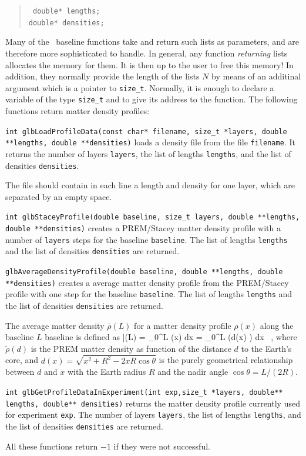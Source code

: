 \begin{quote}
{\tt  
  double* lengths; \\
  double* densities;
}
\end{quote}
Many of the \GLOBES\ baseline functions take and return
such lists as parameters, and are therefore more sophisticated
to handle. In general, any function
{\em returning} lists allocates the memory for them.
It is then up to the user to free this memory!
In addition, they normally provide the length of the lists $N$
by means of an additinal argument which is a pointer to {\tt size\_t}. 
Normally, it is enough to declare
a variable of the type {\tt size\_t} and to give its address to the function.
The following functions return matter density profiles:
\begin{function}
{\tt int glbLoadProfileData(const char* filename, size\_t *layers, double **lengths, double **densities)} loads a density file from the file
{\tt filename}. It returns the number of layers {\tt layers}, the
list of lengths {\tt lengths}, and the list of densities {\tt densities}.
\end{function}
The file should contain in each line a length and density for one layer,
which are separated by an empty space.
\begin{function}
{\tt int glbStaceyProfile(double baseline, size\_t layers, double **lengths, double **densities)} creates a PREM/Stacey matter density profile with a
number of {\tt layers} steps for the baseline {\tt baseline}. The list of lengths {\tt lengths} and the list of densities {\tt densities} are returned.
\end{function}
\begin{function}
{\tt glbAverageDensityProfile(double baseline, double **lengths, 
double **densities)} creates a average matter density profile from the PREM/Stacey profile with one step for the baseline {\tt baseline}. The list of lengths {\tt lengths} and the list of densities {\tt densities} are returned.
\end{function}
The average matter density $\bar{\rho}(L)$ for a matter density profile $\rho(x)$ along the baseline $L$ baseline is defined as
\be
\bar{\rho}(L) =  \int\limits_{0}^L \rho(x) dx = 
 \int\limits_{0}^L \tilde{\rho}\left(d(x) \right) dx \, , 
\ee
where $\tilde{\rho}(d)$ is the PREM matter density as function of the
distance $d$ to the Earth's core, and $d(x)=\sqrt{x^2+R^2-2 x R \cos \theta }$ is the purely geometrical relationship between $d$ and $x$ with the
Earth radius $R$ and the nadir angle $\cos \theta = L/(2 R)$.
\begin{function}
{\tt int glbGetProfileDataInExperiment(int exp,size\_t *layers, double** lengths, double** densities)} returns the matter density profile 
currently used for experiment {\tt exp}. The number of layers {\tt layers}, the list of lengths {\tt lengths}, and the list of densities {\tt densities} are returned.
\end{function}
All these functions return $-1$ if they were not successful.

